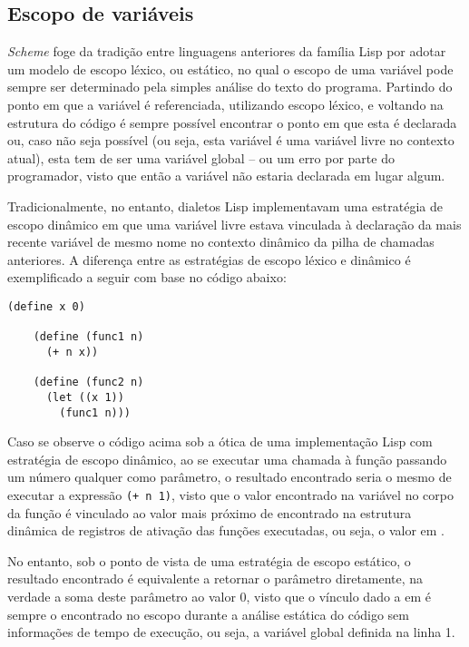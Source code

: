 \subsection{Escopo de variáveis}

\textit{Scheme} foge da tradição entre linguagens anteriores da família Lisp
por adotar um modelo de escopo léxico, ou estático, no qual o escopo de uma
variável pode sempre ser determinado pela simples análise do texto do programa.
Partindo do ponto em que a variável é referenciada, utilizando escopo léxico, e
voltando na estrutura do código é sempre possível encontrar o ponto em que esta
é declarada ou, caso não seja possível (ou seja, esta variável é uma variável
livre no contexto atual), esta tem de ser uma variável global -- ou um erro por
parte do programador, visto que então a variável não estaria declarada em lugar
algum.

Tradicionalmente, no entanto, dialetos Lisp implementavam uma estratégia de
escopo dinâmico em que uma variável livre estava vinculada à declaração da mais
recente variável de mesmo nome no contexto dinâmico da pilha de chamadas
anteriores. A diferença entre as estratégias de escopo léxico e dinâmico é 
exemplificado a seguir com base no código abaixo:

\begin{lstlisting}[frame=none]
    (define x 0)
    
    (define (func1 n) 
      (+ n x))
    
    (define (func2 n) 
      (let ((x 1))
        (func1 n)))
\end{lstlisting}

Caso se observe o código acima sob a ótica de uma implementação Lisp com
estratégia de escopo dinâmico, ao se executar uma chamada à função
 passando um número qualquer  como parâmetro, o resultado
encontrado seria o mesmo de executar a expressão \texttt{(+ n 1)}, visto que o
valor encontrado na variável  no corpo da função  é
vinculado ao valor mais próximo de  encontrado na estrutura dinâmica de
registros de ativação das funções executadas, ou seja, o valor em .

No entanto, sob o ponto de vista de uma estratégia de escopo estático, o
resultado encontrado é equivalente a retornar o parâmetro diretamente, na
verdade a soma deste parâmetro ao valor 0, visto que o vínculo dado a 
em  é sempre o encontrado no escopo durante a análise estática do
código sem informações de tempo de execução, ou seja, a variável global
definida na linha 1.


